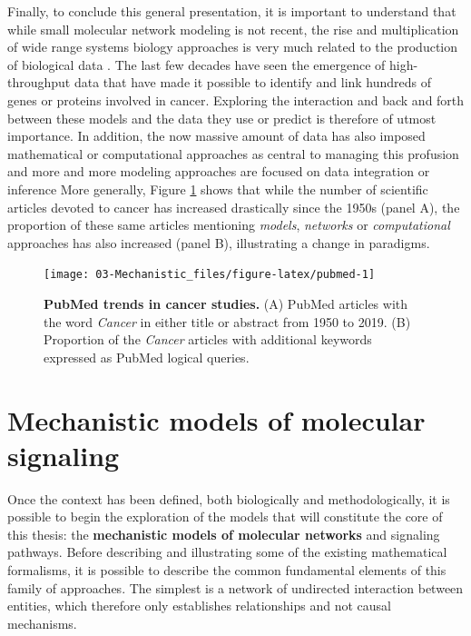 \documentclass[a4paper,12pt,twoside,onecolumn,openright,final,oldfontcommands]{memoir}
\begin{document}
Finally, to conclude this general presentation, it is important to
understand that while small molecular network modeling is not recent,
the rise and multiplication of wide range systems biology approaches is
very much related to the production of biological data
\citep{de2002modeling}. The last few decades have seen the emergence of
high-throughput data that have made it possible to identify and link
hundreds of genes or proteins involved in cancer. Exploring the
interaction and back and forth between these models and the data they
use or predict is therefore of utmost importance. In addition, the now
massive amount of data has also imposed mathematical or computational
approaches as central to managing this profusion and more and more
modeling approaches are focused on data integration or inference
\citep{frohlich2018efficient, bouhaddou2018mechanistic}More generally,
Figure \ref{fig:pubmed} shows that while the number of scientific
articles devoted to cancer has increased drastically since the 1950s
(panel A), the proportion of these same articles mentioning
\emph{models}, \emph{networks} or \emph{computational} approaches has
also increased (panel B), illustrating a change in paradigms.

\begin{figure}

{\centering \texttt{[image: 03-Mechanistic\_files/figure-latex/pubmed-1]} 

}

\caption[PubMed trends in cancer studies.]{\textbf{PubMed trends in cancer studies.} (A)
PubMed articles with the word \emph{Cancer} in either title or abstract
from 1950 to 2019. (B) Proportion of the \emph{Cancer} articles with
additional keywords expressed as PubMed logical queries.}\label{fig:pubmed}
\end{figure}






\section{Mechanistic models of molecular
signaling}\label{mechanistic-models-of-molecular-signaling}

Once the context has been defined, both biologically and
methodologically, it is possible to begin the exploration of the models
that will constitute the core of this thesis: the \textbf{mechanistic
models of molecular networks} and signaling pathways. Before describing
and illustrating some of the existing mathematical formalisms, it is
possible to describe the common fundamental elements of this family of
approaches. The simplest is a network of undirected interaction between
entities, which therefore only establishes relationships and not causal
mechanisms.
\end{document}
